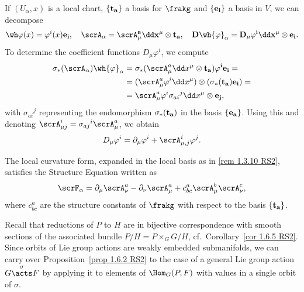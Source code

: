 \begin{rem}\label{rem 1.4.14 RS2}
    If $(U_\alpha,x)$ is a local chart, $\{\bf{t}_a\}$ a basis for $\frakg$ and $\{\bf{e}_i\}$ a basis in $V$, we can decompose
    \[\wh\varphi(x)=\varphi^i(x)\bf{e}_i,\quad \scrA_\alpha=\scrA_\mu^a\dd x^\mu\otimes \bf{t}_a,\quad D\wh{\varphi}_\alpha=D_\mu \varphi^i\dd x^\mu\otimes \bf{e}_i.\]
    To determine the coefficient functions $D_\mu\varphi^i$, we compute
    \begin{align}
        \sigma_\ast(\scrA_\alpha)\wh{\varphi}_\alpha&=\sigma_\ast(\scrA_\mu^a\dd x^\mu\otimes\bf{t}_a)\varphi^i\bf{e}_i=\\
        &=(\scrA_\mu^a\varphi^i\dd x^\mu)\otimes(\sigma_\ast(\bf{t}_a)\bf{e}_i)=\\
        &=\scrA_\mu^a\varphi^i\sigma_{ai}{}^j\dd x^\mu\otimes \bf{e}_j,
    \end{align}
    with $\sigma_{ai}{}^j$ representing the endomorphism $\sigma_\ast(\bf{t}_a)$ in the basis $\{\bf{e}_a\}$. Using this and denoting $\scrA_{\mu j}^i=\sigma_{aj}{}^i\scrA_\mu^a$, we obtain 
    \[D_\mu\varphi^i=\partial_\mu\varphi^i+\scrA_{\mu,j}^i \varphi^j.\]
\end{rem}

\begin{rem}
    The local curvature form, expanded in the local basis as in \ref{rem 1.3.10 RS2}, satisfies the Structure Equation written as
    \[\scrF_\alpha=\partial_\mu \scrA_\nu^a-\partial_\nu\scrA_\mu^a+c^a_{bc}\scrA_\mu^b\scrA_\nu^c,\]
    where $c^a_{bc}$ are the structure constants of $\frakg$ with respect to the basis $\{\bf{t}_a\}$.
\end{rem}

Recall that reductions of $P$ to $H$ are in bijective correspondence with smooth sections of the associated bundle $P\slash H=P\times_G G\slash H$, cf.\ Corollary~\ref{cor 1.6.5 RS2}. Since orbits of Lie group actions are weakly embedded submanifolds, we can carry over Proposition~\ref{prop 1.6.2 RS2} to the case of a general Lie group action $G\overset{\sigma}{\acts}F$ by applying it to elements of $\Hom_G(P,F)$ with values in a single orbit of $\sigma$.


